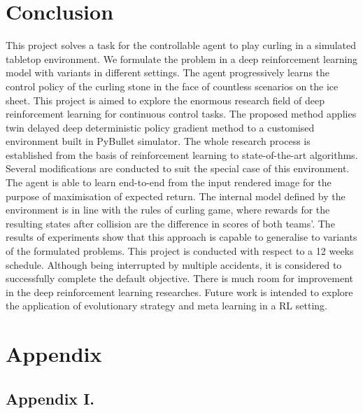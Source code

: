 \documentclass[oneside,11pt,a4paper]{article}
\begin{document}
\section{Conclusion}
This project solves a task for the controllable agent to play curling in a simulated tabletop environment. We formulate the problem in a deep reinforcement learning model with variants in different settings. The agent progressively learns the control policy of the curling stone in the face of countless scenarios on the ice sheet. This project is aimed to explore the enormous research field of deep reinforcement learning for continuous control tasks. The proposed method applies twin delayed deep deterministic policy gradient method to a customised environment built in PyBullet simulator. The whole research process is established from the basis of reinforcement learning to state-of-the-art algorithms. Several modifications are conducted to suit the special case of this environment. The agent is able to learn end-to-end from the input rendered image for the purpose of maximisation of expected return. The internal model defined by the environment is in line with the rules of curling game, where rewards for the resulting states after collision are the difference in scores of both teams'. The results of experiments show that this approach is capable to generalise to variants of the formulated problems. This project is conducted with respect to a 12 weeks schedule. Although being interrupted by multiple accidents, it is considered to successfully complete the default objective. There is much room for improvement in the deep reinforcement learning researches. Future work is intended to explore the application of evolutionary strategy and meta learning in a RL setting.




\clearpage
\lhead{}\rhead{}
{}



\clearpage

\section{Appendix}
\subsection{Appendix I.}
\end{document}
